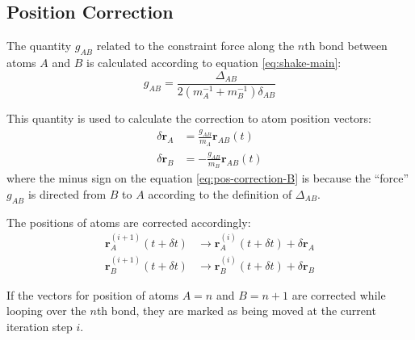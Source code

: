 \subsection{Position Correction}
\label{sec:shake-position-correction}
\begin{tcolorbox}
\par The quantity $g_{AB}$ related to the constraint force along the $n$th bond between atoms $A$ and $B$ is calculated according to equation \ref{eq:shake-main}:
	\begin{equation}
	\label{eq:gab}
	g_{AB} = \frac{\Delta_{AB}}{2(m_A^{-1} + m_B^{-1}) \delta_{AB}}
	\end{equation}
\end{tcolorbox}
\par This quantity is used to calculate the correction to atom position vectors:
\begin{align}
	\label{eq:pos-correction-A}
	\delta \mathbf{r}_A &= \frac{g_{AB}}{m_A} \mathbf{r}_{AB}(t)		\\
	\label{eq:pos-correction-B}
	\delta \mathbf{r}_B &= -\frac{g_{AB}}{m_B} \mathbf{r}_{AB}(t)
\end{align}
where the minus sign on the equation \ref{eq:pos-correction-B} is because the ``force'' $g_{AB}$ is directed from $B$ to $A$ according to the definition of $\Delta_{AB}$.
\par The positions of atoms are corrected accordingly:
\begin{equation}
	\label{eq:update-pos}
	\begin{aligned}
	\mathbf{r}^{(i + 1)}_{A}(t + \delta t) &\rightarrow \mathbf{r}^{(i)}_{A}(t + \delta t) + \delta \mathbf{r}_A \\
	\mathbf{r}^{(i + 1)}_{B}(t + \delta t) &\rightarrow \mathbf{r}^{(i)}_{B}(t + \delta t) + \delta \mathbf{r}_B 
	\end{aligned}
\end{equation}
\par If the vectors for position of atoms $A=n$ and $B=n+1$ are corrected while looping over the $n$th bond, they are marked as being moved at the current iteration step $i$. 